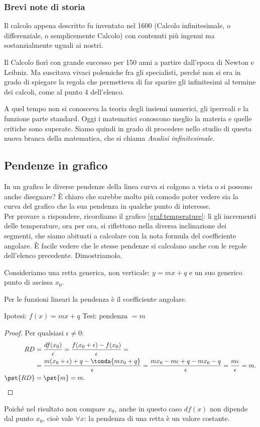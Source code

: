 \subsubsection{Brevi note di storia}
Il calcolo appena descritto fu inventato nel 1600 (Calcolo infinitesimale, o 
differenziale, o semplicemente Calcolo) con contenuti più ingenui ma 
sostanzialmente uguali ai nostri. 

Il Calcolo fiorì con grande successo per 150 anni a partire 
dall'epoca di Newton e Leibniz. 
Ma suscitava vivaci polemiche fra gli specialisti, perché non si era 
in grado di spiegare la regola che permetteva di far sparire gli 
infinitesimi al termine dei calcoli, come al punto 4 dell'elenco.

A quel tempo non si conosceva la teoria degli 
insiemi numerici, gli iperreali e la funzione parte standard.
Oggi i matematici conoscono meglio la materia e quelle critiche  
sono superate. 
Siamo quindi in grado di procedere nello studio di questa nuova branca 
della matematica, che si chiama \emph{Analisi infinitesimale}.


\subsection{Pendenze in grafico}
\label{subsec:pendenze_grafico}
In un grafico le diverse pendenze della linea curva si colgono a vista o si
possono anche disegnare? È chiaro che sarebbe molto più comodo poter vedere 
sia la curva del grafico che la sua pendenza in qualche punto di interesse.\\
Per provare a rispondere, ricordiamo il grafico \ref{graf:temperature}: lì gli 
incrementi delle temperature, ora per ora, si riflettono nella diversa 
inclinazione dei segmenti, che siamo abituati a calcolare con la nota formula 
del coefficiente angolare.  
È facile vedere che le stesse pendenze si calcolano anche con le 
regole dell'elenco precedente. Dimostriamolo. 

Consideriamo una retta generica, non verticale: \(y=mx+q\) e un suo generico 
punto di ascissa \(x_0\).
\begin{teorema}
\label{teo:pendenza_retta}
  Per le funzioni lineari la pendenza è il coefficiente angolare.
\end{teorema}
\noindent Ipotesi: \(f(x)=mx+q\) \tab Tesi: \(\text{pendenza }=m\)
\begin{proof}
Per qualsiasi \(\epsilon\ne 0\):
\begin{align*}
RD &=\dfrac{df(x_0)}{\epsilon} =\dfrac{f(x_0+\epsilon)-f(x_0)}{\epsilon}=\\
               &=\dfrac{m(x_0+\epsilon)+q-\tonda{mx_0+q}}{\epsilon}=
                 \dfrac{mx_0-m\epsilon+q-mx_0-q}{\epsilon}=
                 \dfrac{m\epsilon}{\epsilon}=m.\\
\pst{RD}&= \pst{m}=m.
\end{align*}
\end{proof}
Poiché nel risultato non compare \(x_0\), anche in questo caso \(df(x)\) non 
dipende dal punto \(x_0\), cioè vale \(\forall x\): la pendenza di una retta è 
un 
valore costante.


